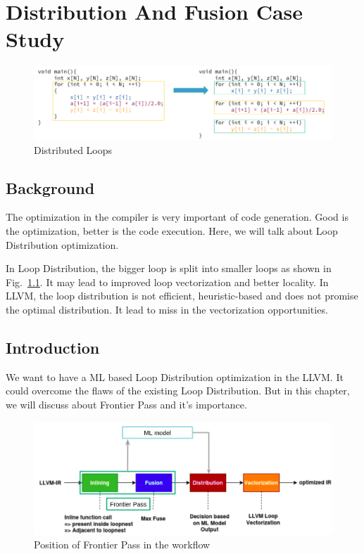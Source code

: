\chapter{Distribution And Fusion Case Study}
\label{chap:ch4}

\begin{figure}[t]
    \centering
    \includegraphics[scale=0.45]{figures/chapter-4/distribution_introduction.png}
    \caption{Distributed Loops}
     \label{fig:dist-introduction}
\end{figure}

\section{Background}
    The optimization in the compiler is very important of code generation.
Good is the optimization, better is the code execution. Here, we will talk about Loop Distribution optimization.

    In Loop Distribution, the bigger loop is split into smaller loops as shown in Fig.~\ref{fig:dist-introduction}. It may lead to improved loop vectorization and better locality. In LLVM, the loop distribution is not efficient, heuristic-based and does not promise the optimal distribution. It lead to miss in the vectorization opportunities.

\section{Introduction}
We want to have a ML based Loop Distribution optimization in the LLVM. It could overcome the flaws of the existing Loop Distribution. But in this chapter, we will discuss about Frontier Pass and it's importance.

\begin{figure}[t]
    \centering
    \includegraphics[scale=0.4]{figures/chapter-4/distribution_flow.png}
    \caption{Position of Frontier Pass in the workflow}
     \label{fig:dist-flow}
\end{figure}

